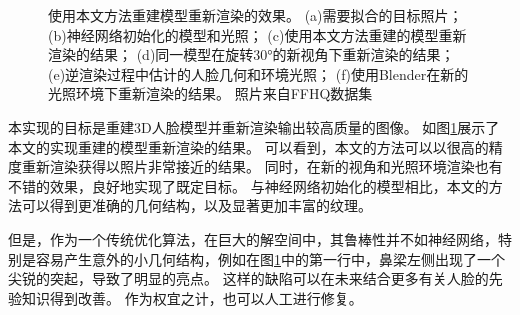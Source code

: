 \begin{figure}
\caption[重建模型重新渲染的效果]{
    使用本文方法重建模型重新渲染的效果。
    (a)需要拟合的目标照片；
    (b)神经网络初始化的模型和光照；
    (c)使用本文方法重建的模型重新渲染的结果；
    (d)同一模型在旋转30°的新视角下重新渲染的结果；
    (e)逆渲染过程中估计的人脸几何和环境光照；
    (f)使用Blender在新的光照环境下重新渲染的结果。
    照片来自FFHQ数据集\citep{styleGAN}
}
\label{fig:rerender}
\end{figure}
本实现的目标是重建3D人脸模型并重新渲染输出较高质量的图像。
如图\ref{fig:rerender}展示了本文的实现重建的模型重新渲染的结果。
可以看到，本文的方法可以以很高的精度重新渲染获得以照片非常接近的结果。
同时，在新的视角和光照环境渲染也有不错的效果，良好地实现了既定目标。
与神经网络初始化的模型相比，本文的方法可以得到更准确的几何结构，以及显著更加丰富的纹理。

但是，作为一个传统优化算法，在巨大的解空间中，其鲁棒性并不如神经网络，特别是容易产生意外的小几何结构，例如在图\ref{fig:rerender}中的第一行中，鼻梁左侧出现了一个尖锐的突起，导致了明显的亮点。
这样的缺陷可以在未来结合更多有关人脸的先验知识得到改善。
作为权宜之计，也可以人工进行修复。

